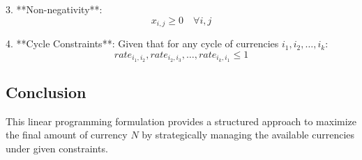 \documentclass{article}
\begin{document}
3. **Non-negativity**:
   \[
   x_{i,j} \geq 0 \quad \forall i, j
   \]

4. **Cycle Constraints**:
   Given that for any cycle of currencies \( i_1, i_2, \ldots, i_k \):
   \[
   rate_{i_1,i_2}, rate_{i_2,i_3}, \ldots, rate_{i_k,i_1} \leq 1
   \]

\subsection*{Conclusion}
This linear programming formulation provides a structured approach to maximize the final amount of currency \( N \) by strategically managing the available currencies under given constraints.
\end{document}
